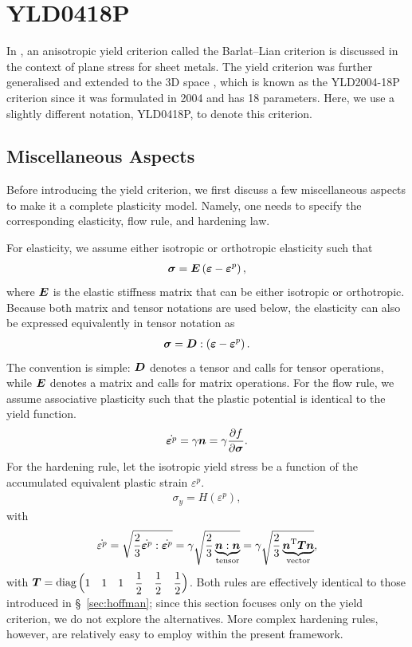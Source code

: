 \section{YLD0418P}\label{sec:ylp0418p}
In \cite{SouzaNeto2008}, an anisotropic yield criterion called the Barlat--Lian criterion \cite{Barlat1989} is discussed in the context of plane stress for sheet metals.
The yield criterion was further generalised \cite{Barlat2003} and extended to the 3D space \cite{Barlat2005}, which is known as the YLD2004-18P criterion since it was formulated in 2004 and has 18 parameters.
Here, we use a slightly different notation, YLD0418P, to denote this criterion.
\subsection{Miscellaneous Aspects}
Before introducing the yield criterion, we first discuss a few miscellaneous aspects to make it a complete plasticity model.
Namely, one needs to specify the corresponding elasticity, flow rule, and hardening law.

For elasticity, we assume either isotropic or orthotropic elasticity such that
\begin{gather}
    \bm{\sigma}=\bm{E}\left(\bm{\varepsilon}-\bm{\varepsilon}^p\right),
\end{gather}
where $\bm{E}$ is the elastic stiffness matrix that can be either isotropic or orthotropic.
Because both matrix and tensor notations are used below, the elasticity can also be expressed equivalently in tensor notation as
\begin{gather}
    \bm{\sigma}=\bm{D}:\left(\bm{\varepsilon}-\bm{\varepsilon}^p\right).
\end{gather}
The convention is simple: $\bm{D}$ denotes a tensor and calls for tensor operations, while $\bm{E}$ denotes a matrix and calls for matrix operations.
For the flow rule, we assume associative plasticity such that the plastic potential is identical to the yield function.
\begin{gather}
    \dot{\bm{\varepsilon}^p}=\gamma\bm{n}=\gamma\dfrac{\partial{f}}{\partial{\bm{\sigma}}}.
\end{gather}
For the hardening rule, let the isotropic yield stress be a function of the accumulated equivalent plastic strain $\varepsilon^p$.
\begin{gather}
    \sigma_y=H\left(\varepsilon^{p}\right),
\end{gather}
with
\begin{gather}
    \dot{\varepsilon^p}=\sqrt{\dfrac{2}{3}\dot{\bm{\varepsilon}^p}:\dot{\bm{\varepsilon}^p}}=\gamma\sqrt{\dfrac{2}{3}\underbrace{\bm{n}:\bm{n}}_\text{tensor}}=\gamma\sqrt{\dfrac{2}{3}\underbrace{\bm{n}^{\mathrm{T}}\bm{T}\bm{n}}_\text{vector}},
\end{gather}
with $\bm{T}=\text{diag}\left(\begin{matrix}
            1 & 1 & 1 & \dfrac{1}{2} & \dfrac{1}{2} & \dfrac{1}{2}
        \end{matrix}\right)$.
Both rules are effectively identical to those introduced in \S~\ref{sec:hoffman}; since this section focuses only on the yield criterion, we do not explore the alternatives.
More complex hardening rules, however, are relatively easy to employ within the present framework.
